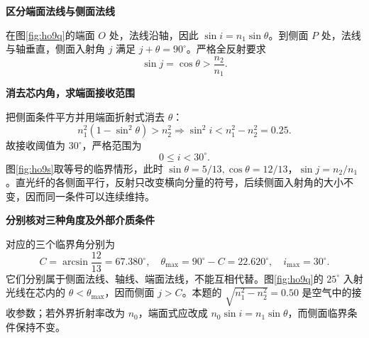 \begin{solution}\textbf{区分端面法线与侧面法线}\par\nobreak
在图\ref{fig:ho9q}的端面 $O$ 处，法线沿轴，因此 $\sin i=n_1\sin\theta$。到侧面 $P$ 处，法线与轴垂直，侧面入射角 $j$ 满足 $j+\theta=90^\circ$。严格全反射要求
\[
\sin j=\cos\theta>\frac{n_2}{n_1}.
\]



\par\medskip{}\noindent\textbf{消去芯内角，求端面接收范围}\par\nobreak
把侧面条件平方并用端面折射式消去 $\theta$：
\[
n_1^2(1-\sin^2\theta)>n_2^2
\Longrightarrow \sin^2i<n_1^2-n_2^2=0.25.
\]
故接收阈值为 $30^\circ$，严格范围为
\[
\boxed{0\le i<30^\circ.}
\]
图\ref{fig:ho9s}取等号的临界情形，此时 $\sin\theta=5/13,\cos\theta=12/13$，$\sin j=n_2/n_1$。直光纤的各侧面平行，反射只改变横向分量的符号，后续侧面入射角的大小不变，因而同一条件可以连续维持。



\par\medskip{}\noindent\textbf{分别核对三种角度及外部介质条件}\par\nobreak
对应的三个临界角分别为
\[
C=\arcsin\frac{12}{13}=67.380^\circ,\quad
\theta_{\max}=90^\circ-C=22.620^\circ,\quad
i_{\max}=30^\circ.
\]
它们分别属于侧面法线、轴线、端面法线，不能互相代替。图\ref{fig:ho9q}的 $25^\circ$ 入射光线在芯内的 $\theta<\theta_{\max}$，因而侧面 $j>C$。本题的 $\sqrt{n_1^2-n_2^2}=0.50$ 是空气中的接收参数；若外界折射率改为 $n_0$，端面式应改成 $n_0\sin i=n_1\sin\theta$，而侧面临界条件保持不变。
\end{solution}

